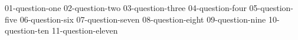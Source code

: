 \documentclass[paper=a4, DIV=11, fontsize=12pt, parskip=full]{scrartcl}
\begin{document}
\maketitle

{01-question-one}
{02-question-two}
{03-question-three}
{04-question-four}
{05-question-five}
{06-question-six}
{07-question-seven}
{08-question-eight}
{09-question-nine}
{10-question-ten}
{11-question-eleven}
\end{document}
